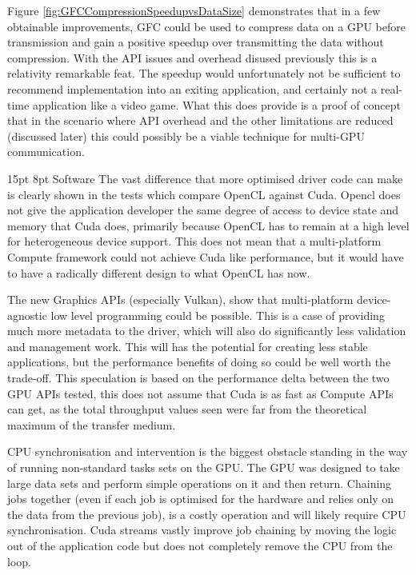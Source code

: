 \documentclass[12pt,a4paper]{article}
\makeatletter
\renewcommand\subsection{\@startsection {subsection}{1}{2mm} %
                               {15pt} %
                               {8pt} %
                               {\fontsize{13pt}{1em}\bfseries}}
\makeatother
\begin{document}
Figure \ref{fig:GFCCompressionSpeedupvsDataSize} demonstrates that in a few obtainable improvements, GFC could be used to compress data on a GPU before transmission and gain a positive speedup over transmitting the data without compression. With the API issues and overhead disused previously this is a relativity remarkable feat. The speedup would unfortunately not be sufficient to recommend implementation into an exiting application, and certainly not a real-time application like a video game. What this does provide is a proof of concept that in the scenario where API overhead and the other limitations are reduced (discussed later) this could possibly be a viable technique for multi-GPU communication.

\subsection{Software}
The vast difference that more optimised driver code can make is clearly shown in the tests which compare OpenCL against Cuda. Opencl does not give the application developer the same degree of access to device state and memory that Cuda does, primarily because OpenCL has to remain at a high level for heterogeneous device support. This does not mean that a multi-platform Compute framework could not achieve Cuda like performance, but it would have to have a radically different design to what OpenCL has now. 

The new Graphics APIs (especially Vulkan), show that multi-platform device-agnostic low level programming could be possible. This is a case of providing much more metadata to the driver, which will also do significantly less validation and management work. This will has the potential for creating less stable applications, but the performance benefits of doing so could be well worth the trade-off. This speculation is based on the performance delta between the two GPU APIs tested, this does not assume that Cuda is as fast as Compute APIs can get, as the total throughput values seen were far from the theoretical maximum of the transfer medium. 

CPU synchronisation and intervention is the biggest obstacle standing in the way of running non-standard tasks sets on the GPU. The GPU was designed to take large data sets and perform simple operations on it and then return. Chaining jobs together (even if each job is optimised for the hardware and relies only on the data from the previous job), is a costly operation and will likely require CPU synchronisation. Cuda streams vastly improve job chaining by moving the logic out of the application code but does not completely remove the CPU from the loop.
\end{document}

